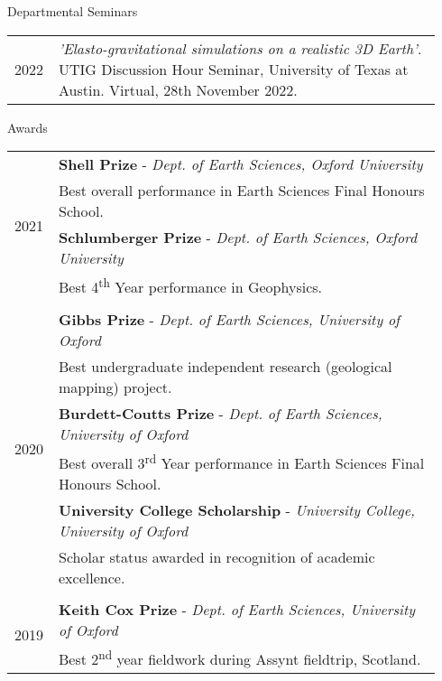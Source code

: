 \documentclass{resume}
\begin{document}
\vspace{0.2cm}
\begin{rSection}{Departmental Seminars}

\begin{tabular}{p{0.07\linewidth} | p{0.87\linewidth}}
\multirow{1}{*}{2022} & \textit{'Elasto-gravitational simulations on a realistic 3D Earth'}. UTIG Discussion Hour Seminar, University of Texas at Austin. Virtual, 28th November 2022. \\  
\end{tabular}
\end{rSection}

\vspace{0.2cm}
\begin{rSection}{Awards}

\begin{tabular}{p{0.07\linewidth} | p{0.87\linewidth}}
\multirow{4}{*}{2021}& \textbf{Shell Prize} - \textit{Dept. of Earth Sciences, Oxford University} \\  & \hspace{0.7cm} Best overall performance in Earth Sciences Final Honours School.  \\
&  \textbf{Schlumberger Prize} - \textit{Dept. of Earth Sciences, Oxford University} \\ &\hspace{0.7cm} Best 4\textsuperscript{th} Year performance in Geophysics. \\ 
\\
\multirow{6}{*}{2020}& \textbf{Gibbs Prize} - \textit{Dept. of Earth Sciences, University of Oxford} \\ & \hspace{0.7cm} Best undergraduate independent research (geological mapping) project. \\
& \textbf{Burdett-Coutts Prize} - \textit{Dept. of Earth Sciences, University of Oxford} \\ & \hspace{0.7cm} Best overall 3\textsuperscript{rd} Year performance in Earth Sciences Final Honours School. \\ 
& \textbf{University College Scholarship} - \textit{University College, University of Oxford} \\ & \hspace{0.7cm} Scholar status awarded in recognition of academic excellence. \\ 
\\
\multirow{4}{*}{2019}& \textbf{Keith Cox Prize} - \textit{Dept. of Earth Sciences, University of Oxford} \\ & \hspace{0.7cm}Best 2\textsuperscript{nd} year fieldwork during Assynt fieldtrip, Scotland. \\

\end{tabular}
\end{rSection}
\end{document}
